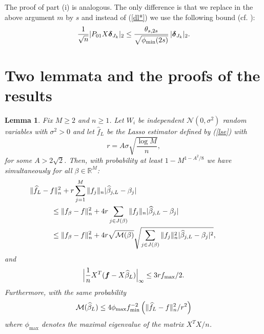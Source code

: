 \documentclass[dvips,aos]{imsart}
\numberwithin{equation}{section}
\theoremstyle{plain}
\newtheorem{lemma}[thm]{Lemma}
\def\sf{}
\def\wideth{\widehat}
\def\scm{{\cal M}}
\def\wh{\widehat}
\def\RR{\mathbb R}
\newcommand{\bD}{\mbox{\boldmath$\delta$}}
\newcommand{\bmf}{\mbox{\boldmath$f$}}
\begin{document}
The proof of part (i) is analogous. The only difference is that we
replace in the above argument $m$ by $s$ and instead of (\ref{dl*})
we use the following bound (cf. \cite{ct07}):
\begin{equation*}\begin{split}%
\frac{1}{\sqrt{n}}|P_{01} X \bD_{J_{k}}|_2 \le
\frac{\theta_{s,2s}}{\sqrt{\phi_{\min}(2s)}}\,|\bD_{J_{k}}|_2.
\end{split}\end{equation*}






\section{Two lemmata and the proofs of the results}
\label{app:proofs}
\begin{lemma}\label{ll1} Fix $M\ge2$ and $n\ge1$.
Let  $W_i$ be independent ${\mathcal N}(0,\sigma^2)$ random
variables with $\sigma^2>0$ and let $\wideth f_L$ be the Lasso
estimator defined by (\ref{lse}) with
$$
r= A\sigma \sqrt{\frac{\log M}{n}},
$$
for some $A>2\sqrt{2}$. Then, with probability at least
$1-M^{1-A^2/8}$ we have simultaneously for all $\beta\in\RR^M$:
\begin{equation}\begin{split}\label{onA}
&\hspace{-3em}\| \widehat f_L - f\|_n^2 + r\sum_{j=1}^M \|f_j\|_{n}     |\widehat \beta_{j,L}
- \beta_j|
\\
&\le \| {\sf f}_{\beta} - f\|_n^2 + 4r \sum_{j\in
J(\beta)} \|f_j\|_{n}|\widehat \beta_{j,L} - \beta_j|
\\
&\le \| {\sf f}_{\beta} - f\|_n^2 +
4r \sqrt{\scm(\beta)}\sqrt{\sum_{j\in J(\beta)} \|f_j\|_{n}^2|\widehat
\beta_{j,L} - \beta_j|^2},
\end{split}\end{equation}
and
\begin{equation}\begin{split}\label{dcf}
\Big|\frac{1}{n}X^T({\bmf }-X\widehat\beta_L)\Big|_\infty \le
3rf_{\max}/2.
\end{split}\end{equation}
Furthermore, with the same probability
\begin{equation}\begin{split}\label{Lassom}
\scm(\wh\beta_L) \le 4 \phi_{\max} f_{\min}^{-2} \left(\| \widehat f_L
- f\|_n^2/r^2 \right)
\end{split}\end{equation}
where $\phi_{\max}$ denotes the maximal eigenvalue of the matrix
$X^TX/n$.
\end{lemma}
\end{document}

